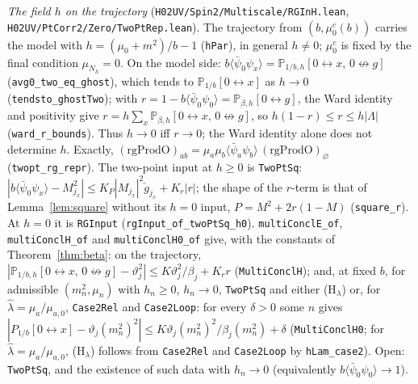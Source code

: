 \documentclass[11pt]{amsart}
\theoremstyle{definition}
\theoremstyle{remark}
\numberwithin{equation}{section}
\newcommand{\Pb}{\mathbb{P}}
\newcommand{\avg}[1]{\langle #1\rangle}
\newcommand{\conn}{\leftrightarrow}
\begin{document}
\emph{The field $h$ on the trajectory} (\texttt{H02UV/Spin2/Multiscale/RGInH.lean}, \texttt{H02UV/PtCorr2/Zero/TwoPtRep.lean}). The trajectory from
$(b,\mu_0^c(b))$ carries the model with $h=(\mu_0+m^2)/b-1$ (\texttt{hPar}), in general $h\ne0$; $\mu_0^c$ is fixed by the final
condition $\mu_{N_h}=0$. On the model side: $b\avg{\bar\psi_0\psi_x}=\Pb_{1/b,h}[0\conn x,\,0\not\leftrightarrow g]$
(\texttt{avg0\_two\_eq\_ghost}), which tends to $\Pb_{1/b}[0\conn x]$ as $h\to0$ (\texttt{tendsto\_ghostTwo}); with
$r=1-b\avg{\bar\psi_0\psi_0}=\Pb_{\beta,h}[0\leftrightarrow g]$, the Ward identity and positivity give $r=h\sum_x\Pb_{\beta,h}[0\conn x,\,0\not\leftrightarrow g]$, so
$h(1-r)\le r\le h|\Lambda|$ (\texttt{ward\_r\_bounds}). Thus $h\to0$ iff $r\to0$; the Ward identity alone does not determine $h$.
Exactly, $(\mathrm{rgProdO})_{ab}=\mu_a\mu_b\avg{\bar\psi_a\psi_b}\,(\mathrm{rgProdO})_\varnothing$ (\texttt{twopt\_rg\_repr}). The
two-point input at $h\ge0$ is \texttt{TwoPtSq}:
$|b\avg{\bar\psi_0\psi_x}-M_{j_x}^2|\le K_P|M_{j_x}|^2\check g_{j_x}+K_r|r|$; the shape of the $r$-term is that of Lemma~\ref{lem:square}
without its $h=0$ input, $P=M^2+2r(1-M)$ (\texttt{square\_r}). At $h=0$ it is \texttt{RGInput} (\texttt{rgInput\_of\_twoPtSq\_h0}).
\texttt{multiConclE\_of}, \texttt{multiConclH\_of} and \texttt{multiConclH0\_of} give, with the constants of Theorem~\ref{thm:beta}: on the trajectory,
$|\Pb_{1/b,h}[0\conn x,\,0\not\leftrightarrow g]-\vartheta_j^2|\le K\vartheta_j^2/\beta_j+K_rr$ (\texttt{MultiConclH}); and, at fixed $b$, for admissible
$(m_n^2,\mu_n)$ with $h_n\ge0$, $h_n\to0$, \texttt{TwoPtSq} and either (H$_\lambda$) or, for $\hat\lambda=\mu_a/\mu_{a,0}$, \texttt{Case2Rel} and
\texttt{Case2Loop}: for every $\delta>0$ some $n$ gives $|P_{1/b}[0\conn x]-\vartheta_j(m_n^2)^2|\le K\vartheta_j(m_n^2)^2/\beta_j(m_n^2)+\delta$
(\texttt{MultiConclH0}; for $\hat\lambda=\mu_a/\mu_{a,0}$, (H$_\lambda$) follows from \texttt{Case2Rel} and \texttt{Case2Loop} by \texttt{hLam\_case2}). Open: \texttt{TwoPtSq}, and the existence of such data with $h_n\to0$
(equivalently $b\avg{\bar\psi_0\psi_0}\to1$).
\end{document}
